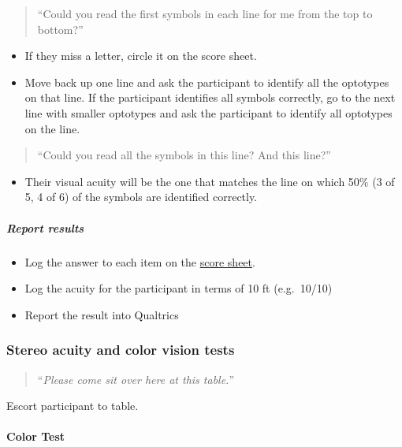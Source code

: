 \documentclass[]{article}
\providecommand{\tightlist}{%
  \setlength{\itemsep}{0pt}\setlength{\parskip}{0pt}}
\let\oldparagraph\paragraph
\renewcommand{\paragraph}[1]{\oldparagraph{#1}\mbox{}}
\let\oldsubparagraph\subparagraph
\renewcommand{\subparagraph}[1]{\oldsubparagraph{#1}\mbox{}}
\begin{document}
\begin{quote}
``Could you read the first symbols in each line for me from the top to
bottom?''
\end{quote}

\begin{itemize}
\tightlist
\item
  If they miss a letter, circle it on the score sheet.
\item
  Move back up one line and ask the participant to identify all the
  optotypes on that line. If the participant identifies all symbols
  correctly, go to the next line with smaller optotypes and ask the
  participant to identify all optotypes on the line.
\end{itemize}

\begin{quote}
``Could you read all the symbols in this line? And this line?''
\end{quote}

\begin{itemize}
\tightlist
\item
  Their visual acuity will be the one that matches the line on which
  50\% (3 of 5, 4 of 6) of the symbols are identified correctly.
\end{itemize}

\subparagraph{Report results}\label{report-results}

\begin{itemize}
\tightlist
\item
  Log the answer to each item on the
  \href{vision-screening-score-sheet.html}{score sheet}.
\item
  Log the acuity for the participant in terms of 10 ft (e.g.~10/10)
\item
  Report the result into Qualtrics
\end{itemize}

\subsubsection{Stereo acuity and color vision
tests}\label{stereo-acuity-and-color-vision-tests}

\begin{quote}
``\emph{Please come sit over here at this table.}''
\end{quote}

Escort participant to table.

\paragraph{Color Test}\label{color-test}
\end{document}
